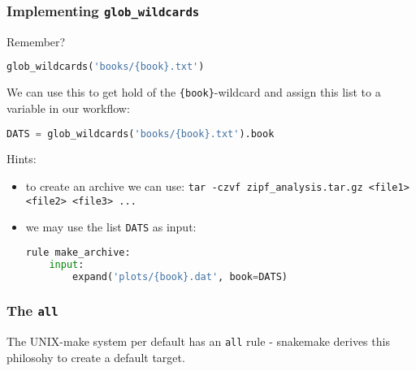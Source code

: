 \begin{frame}[fragile]
  \frametitle{Implementing \texttt{glob\_wildcards}}
  Remember?
  \begin{lstlisting}[language=Python,style=Python,basicstyle=\tiny]
glob_wildcards('books/{book}.txt')
  \end{lstlisting}
  \pause
  We can use this to get hold of the \texttt{\{book\}}-wildcard and assign this list to a variable in our workflow:
  \begin{lstlisting}[language=Python,style=Python,basicstyle=\tiny]
DATS = glob_wildcards('books/{book}.txt').book
  \end{lstlisting}
  \footnotesize
  Hints:
      \begin{itemize}
       \item to create an archive we can use: \texttt{tar -czvf zipf\_analysis.tar.gz <file1> <file2> <file3> ...}
       \item we may use the list \texttt{DATS} as input:
          \begin{lstlisting}[language=Python,style=Python,basicstyle=\tiny]
rule make_archive:
    input:
        expand('plots/{book}.dat', book=DATS)
          \end{lstlisting}
      \end{itemize}
\end{frame}

\begin{frame}[fragile]
  \frametitle{The \texttt{all}}
  The UNIX-make system per default has an \texttt{all} rule - snakemake derives this philosohy to create a default target.
\end{frame}



